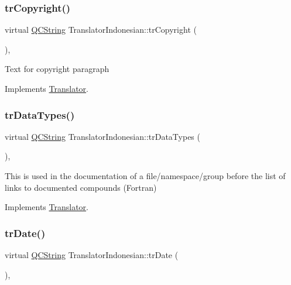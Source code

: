 \mbox{\label{class_translator_indonesian_a63d763f3ecdeb38fc19708335f302970}} 
\subsubsection{\texorpdfstring{trCopyright()}{trCopyright()}}
{\footnotesize\ttfamily virtual \mbox{\hyperlink{class_q_c_string}{Q\+C\+String}} Translator\+Indonesian\+::tr\+Copyright (\begin{DoxyParamCaption}{ }\end{DoxyParamCaption})\hspace{0.3cm}{\ttfamily [inline]}, {\ttfamily [virtual]}}

Text for copyright paragraph 

Implements \mbox{\hyperlink{class_translator}{Translator}}.

\mbox{\label{class_translator_indonesian_a0f2871d2288f40d6c52f1a23f5c9d8e4}} 
\subsubsection{\texorpdfstring{trDataTypes()}{trDataTypes()}}
{\footnotesize\ttfamily virtual \mbox{\hyperlink{class_q_c_string}{Q\+C\+String}} Translator\+Indonesian\+::tr\+Data\+Types (\begin{DoxyParamCaption}{ }\end{DoxyParamCaption})\hspace{0.3cm}{\ttfamily [inline]}, {\ttfamily [virtual]}}

This is used in the documentation of a file/namespace/group before the list of links to documented compounds (Fortran) 

Implements \mbox{\hyperlink{class_translator}{Translator}}.

\mbox{\label{class_translator_indonesian_a6578f99f83d533cc5590e425bdc7d107}} 
\subsubsection{\texorpdfstring{trDate()}{trDate()}}
{\footnotesize\ttfamily virtual \mbox{\hyperlink{class_q_c_string}{Q\+C\+String}} Translator\+Indonesian\+::tr\+Date (\begin{DoxyParamCaption}{ }\end{DoxyParamCaption})\hspace{0.3cm}{\ttfamily [inline]}, {\ttfamily [virtual]}}


